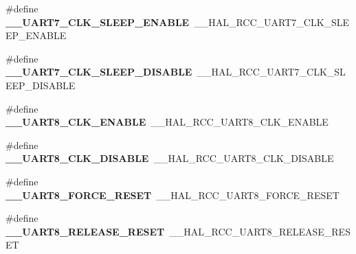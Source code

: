 \begin{DoxyCompactItemize}
\item 
\hypertarget{group___h_a_l___r_c_c___aliased_ga947a94806fd8c9b1a322dccf17e05e4a}{\#define {\bfseries \-\_\-\-\_\-\-U\-A\-R\-T7\-\_\-\-C\-L\-K\-\_\-\-S\-L\-E\-E\-P\-\_\-\-E\-N\-A\-B\-L\-E}~\-\_\-\-\_\-\-H\-A\-L\-\_\-\-R\-C\-C\-\_\-\-U\-A\-R\-T7\-\_\-\-C\-L\-K\-\_\-\-S\-L\-E\-E\-P\-\_\-\-E\-N\-A\-B\-L\-E}\label{group___h_a_l___r_c_c___aliased_ga947a94806fd8c9b1a322dccf17e05e4a}

\item 
\hypertarget{group___h_a_l___r_c_c___aliased_ga8bef143f6c75c16d0bfe0e242eb798cb}{\#define {\bfseries \-\_\-\-\_\-\-U\-A\-R\-T7\-\_\-\-C\-L\-K\-\_\-\-S\-L\-E\-E\-P\-\_\-\-D\-I\-S\-A\-B\-L\-E}~\-\_\-\-\_\-\-H\-A\-L\-\_\-\-R\-C\-C\-\_\-\-U\-A\-R\-T7\-\_\-\-C\-L\-K\-\_\-\-S\-L\-E\-E\-P\-\_\-\-D\-I\-S\-A\-B\-L\-E}\label{group___h_a_l___r_c_c___aliased_ga8bef143f6c75c16d0bfe0e242eb798cb}

\item 
\hypertarget{group___h_a_l___r_c_c___aliased_gad5875e7ed7c3a6d37da63cdf41998f52}{\#define {\bfseries \-\_\-\-\_\-\-U\-A\-R\-T8\-\_\-\-C\-L\-K\-\_\-\-E\-N\-A\-B\-L\-E}~\-\_\-\-\_\-\-H\-A\-L\-\_\-\-R\-C\-C\-\_\-\-U\-A\-R\-T8\-\_\-\-C\-L\-K\-\_\-\-E\-N\-A\-B\-L\-E}\label{group___h_a_l___r_c_c___aliased_gad5875e7ed7c3a6d37da63cdf41998f52}

\item 
\hypertarget{group___h_a_l___r_c_c___aliased_ga623f01b12af9603571fa4e40f186860c}{\#define {\bfseries \-\_\-\-\_\-\-U\-A\-R\-T8\-\_\-\-C\-L\-K\-\_\-\-D\-I\-S\-A\-B\-L\-E}~\-\_\-\-\_\-\-H\-A\-L\-\_\-\-R\-C\-C\-\_\-\-U\-A\-R\-T8\-\_\-\-C\-L\-K\-\_\-\-D\-I\-S\-A\-B\-L\-E}\label{group___h_a_l___r_c_c___aliased_ga623f01b12af9603571fa4e40f186860c}

\item 
\hypertarget{group___h_a_l___r_c_c___aliased_ga138e06749e64d444de65bbef30dd3fe1}{\#define {\bfseries \-\_\-\-\_\-\-U\-A\-R\-T8\-\_\-\-F\-O\-R\-C\-E\-\_\-\-R\-E\-S\-E\-T}~\-\_\-\-\_\-\-H\-A\-L\-\_\-\-R\-C\-C\-\_\-\-U\-A\-R\-T8\-\_\-\-F\-O\-R\-C\-E\-\_\-\-R\-E\-S\-E\-T}\label{group___h_a_l___r_c_c___aliased_ga138e06749e64d444de65bbef30dd3fe1}

\item 
\hypertarget{group___h_a_l___r_c_c___aliased_ga88357c03e387b9df7ef294f5d46bb936}{\#define {\bfseries \-\_\-\-\_\-\-U\-A\-R\-T8\-\_\-\-R\-E\-L\-E\-A\-S\-E\-\_\-\-R\-E\-S\-E\-T}~\-\_\-\-\_\-\-H\-A\-L\-\_\-\-R\-C\-C\-\_\-\-U\-A\-R\-T8\-\_\-\-R\-E\-L\-E\-A\-S\-E\-\_\-\-R\-E\-S\-E\-T}\label{group___h_a_l___r_c_c___aliased_ga88357c03e387b9df7ef294f5d46bb936}


\end{DoxyCompactItemize}
